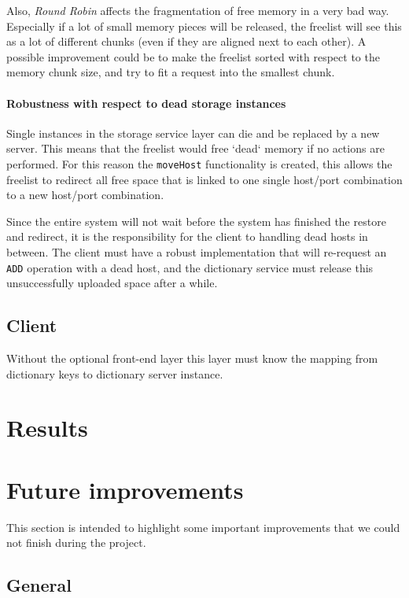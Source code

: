 \documentclass[12pt,a4paper]{scrartcl}
\begin{document}
Also, \emph{Round Robin} affects the fragmentation of free memory in a very bad way. Especially if a lot of small memory pieces will be released, the freelist will see this as a lot of different chunks (even if they are aligned next to each other). A possible improvement could be to make the freelist sorted with respect to the memory chunk size, and try to fit a request into the smallest chunk.

\paragraph{Robustness with respect to dead storage instances}
Single instances in the storage service layer can die and be replaced by a new server. This means that the freelist would free `dead` memory if no actions are performed. For this reason the \verb|moveHost| functionality is created, this allows the freelist to redirect all free space that is linked to one single host/port combination to a new host/port combination.

Since the entire system will not wait before the system has finished the restore and redirect, it is the responsibility for the client to handling dead hosts in between. The client must have a robust implementation that will re-request an \verb|ADD| operation with a dead host, and the dictionary service must release this unsuccessfully uploaded space after a while.

\subsection{Client}
Without the optional front-end layer this layer must know the mapping from dictionary keys to dictionary server instance.

\section{Results}

\section{Future improvements}
This section is intended to highlight some important improvements that we could not finish during the project.

\subsection{General}
\end{document}
